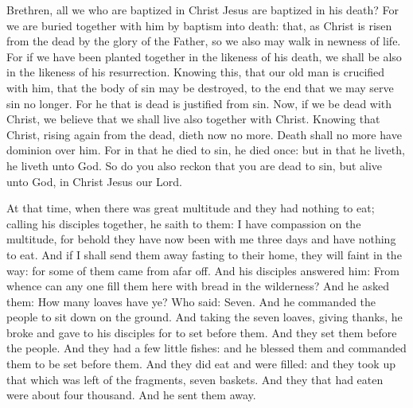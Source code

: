 \bigskip



Brethren, all we who are baptized in Christ Jesus are
baptized in his death?
For we are buried together with him by baptism into death: that, as
Christ is risen from the dead by the glory of the Father, so we also may
walk in newness of life.
For if we have been planted together in the likeness of his death,
we shall be also in the likeness of his resurrection.
Knowing this, that our old man is crucified with him, that the body
of sin may be destroyed, to the end that we may serve sin no longer.
For he that is dead is justified from sin.
Now, if we be dead with Christ, we believe that we shall live also
together with Christ.
Knowing that Christ, rising again from the dead, dieth now no more.
Death shall no more have dominion over him.
For in that he died to sin, he died once: but in that he liveth,
he liveth unto God.
So do you also reckon that you are dead to sin, but alive unto
God, in Christ Jesus our Lord.



At that time, when there was great multitude and they had
nothing to eat; calling his disciples together, he saith to them:
I have compassion on the multitude, for behold they have now been
with me three days and have nothing to eat.
And if I shall send them away fasting to their home, they will
faint in the way: for some of them came from afar off.
And his disciples answered him: From whence can any one fill them
here with bread in the wilderness?
And he asked them: How many loaves have ye? Who said: Seven.
And he commanded the people to sit down on the ground. And taking
the seven loaves, giving thanks, he broke and gave to his disciples for
to set before them. And they set them before the people.
And they had a few little fishes: and he blessed them and commanded
them to be set before them.
And they did eat and were filled: and they took up that which was
left of the fragments, seven baskets.
And they that had eaten were about four thousand. And he sent them
away.



\bigskip


